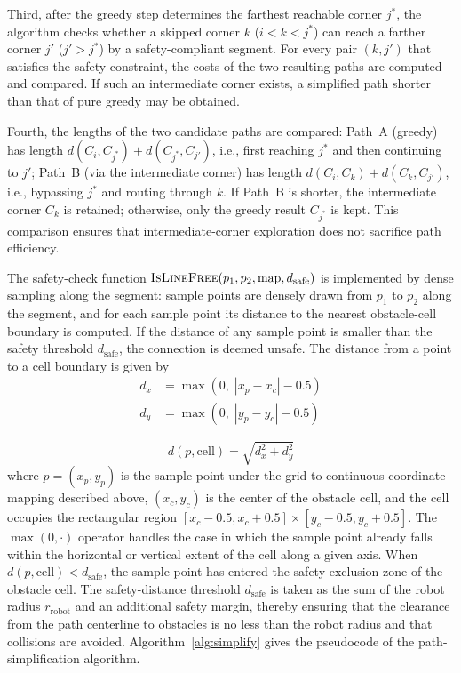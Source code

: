 Third, after the greedy step determines the farthest reachable corner $j^{*}$, the algorithm checks whether a skipped corner $k$ ($i < k < j^{*}$) can reach a farther corner $j'$ ($j' > j^{*}$) by a safety-compliant segment. For every pair $(k, j')$ that satisfies the safety constraint, the costs of the two resulting paths are computed and compared. If such an intermediate corner exists, a simplified path shorter than that of pure greedy may be obtained.

Fourth, the lengths of the two candidate paths are compared: Path~A (greedy) has length $d(C_i, C_{j^{*}}) + d(C_{j^{*}}, C_{j'})$, i.e., first reaching $j^{*}$ and then continuing to $j'$; Path~B (via the intermediate corner) has length $d(C_i, C_k) + d(C_k, C_{j'})$, i.e., bypassing $j^{*}$ and routing through $k$. If Path~B is shorter, the intermediate corner $C_k$ is retained; otherwise, only the greedy result $C_{j^{*}}$ is kept. This comparison ensures that intermediate-corner exploration does not sacrifice path efficiency.

The safety-check function $\textsc{IsLineFree}(p_1, p_2, \mathrm{map}, d_{\mathrm{safe}})$ is implemented by dense sampling along the segment: sample points are densely drawn from $p_1$ to $p_2$ along the segment, and for each sample point its distance to the nearest obstacle-cell boundary is computed. If the distance of any sample point is smaller than the safety threshold $d_{\mathrm{safe}}$, the connection is deemed unsafe. The distance from a point to a cell boundary is given by
\begin{equation}
\begin{split}
d_x &= \max\left(0,\; |x_p - x_c| - 0.5\right)\\
d_y &= \max\left(0,\; |y_p - y_c| - 0.5\right)
\end{split}
\label{eq:dxymax}
\end{equation}

\begin{equation}
d(p, \mathrm{cell}) = \sqrt{d_x^2 + d_y^2}
\label{eq:dist}
\end{equation}
where $p = (x_p, y_p)$ is the sample point under the grid-to-continuous coordinate mapping described above, $(x_c, y_c)$ is the center of the obstacle cell, and the cell occupies the rectangular region $[x_c - 0.5, x_c + 0.5] \times [y_c - 0.5, y_c + 0.5]$. The $\max(0, \cdot)$ operator handles the case in which the sample point already falls within the horizontal or vertical extent of the cell along a given axis. When $d(p, \mathrm{cell}) < d_{\mathrm{safe}}$, the sample point has entered the safety exclusion zone of the obstacle cell. The safety-distance threshold $d_{\mathrm{safe}}$ is taken as the sum of the robot radius $r_{\mathrm{robot}}$ and an additional safety margin, thereby ensuring that the clearance from the path centerline to obstacles is no less than the robot radius and that collisions are avoided. Algorithm~\textcolor{blue}{\ref{alg:simplify}} gives the pseudocode of the path-simplification algorithm.

